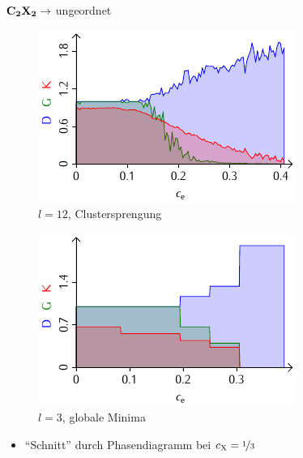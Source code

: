 \documentclass{beamer}
\def \cX {c_\mathrm{X}}
\begin{document}
	\begin{frame}{$\bf C_{\boldsymbol 2}X_{\boldsymbol 2} \rightarrow$ ungeordnet}
		\begin{figure}
			\scriptsize
			\begin{minipage}{0.48\textwidth}
				\centering
				\includegraphics[width=\textwidth]{Abbildungen/C2X2-random.pdf} \\
				$l = 12$, Clustersprengung
			\end{minipage}
			\hfill
			\begin{minipage}{0.48\textwidth}
				\centering
				\includegraphics[width=\textwidth]{Abbildungen/C2X2-random-exact.pdf} \\
				$l = 3$, globale Minima
			\end{minipage}
		\end{figure}
		\begin{itemize}
			\item "`Schnitt"' durch Phasendiagramm bei $\cX = \nicefrac 1 3$

\end{itemize}
\end{frame}
\end{document}
